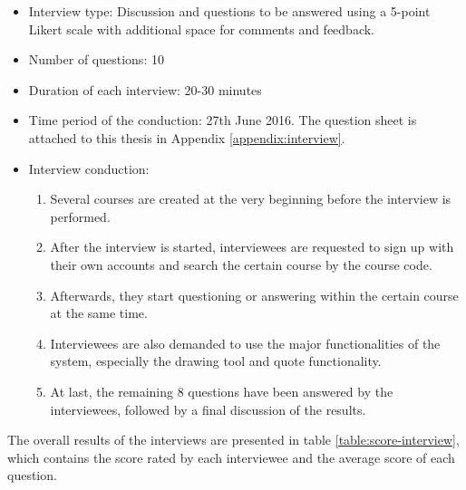 \begin{itemize}
  \item  Interview type: Discussion and questions to be answered using a 5-point Likert scale with additional space for comments and feedback.
  \item  Number of questions: 10
  \item  Duration of each interview: 20-30 minutes
  \item  Time period of the conduction: 27th June 2016. The question sheet is attached to this thesis in Appendix \ref{appendix:interview}.
  \item  Interview conduction: 
  \begin{enumerate}
    \item Several courses are created at the very beginning before the interview is performed. 
    \item After the interview is started, interviewees are requested to sign up with their own accounts and search the certain course by the course code.
    \item Afterwards, they start questioning or answering within the certain course at the same time.
    \item Interviewees are also demanded to use the major functionalities of the system, especially the drawing tool and quote functionality.
    \item At last, the remaining 8 questions have been answered by the interviewees, followed by a final discussion of the results.
  \end{enumerate}
\end{itemize}

The overall results of the interviews are presented in table \ref{table:score-interview}, which contains the score rated by each interviewee and the average score of each question. 

